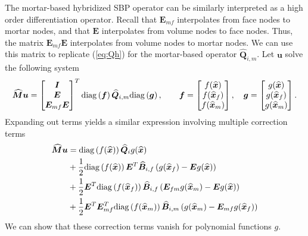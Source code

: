 \documentclass{svjour3}                     %
\renewcommand{\hat}{\widehat}
\newcommand{\diag}[1]{{\rm diag}\LRp{#1}}
\newcommand{\pd}[2]{\frac{\partial#1}{\partial#2}}
\newcommand{\LRp}[1]{\left( #1 \right)}
\begin{document}

The mortar-based hybridized SBP operator can be similarly interpreted as a high order differentiation operator.  Recall that $\bm{E}_{mf}$ interpolates from face nodes to mortar nodes, and that $\bm{E}$ interpolates from volume nodes to face nodes.  Thus, the matrix $\bm{E}_{mf}\bm{E}$ interpolates from volume nodes to mortar nodes.  We can use this matrix to replicate (\ref{eq:Qh}) for the mortar-based operator $\hat{\bm{Q}}_{i,m}$.  Let $\bm{u}$ solve the following system
\begin{align}
\hat{\bm{M}}\bm{u} = \begin{bmatrix}
\bm{I}\\
\bm{E}\\
\bm{E}_{mf}\bm{E}
\end{bmatrix}^T \diag{\bm{f}}\hat{\bm{Q}}_{i,m} \diag{\bm{g}}, \qquad \bm{f} = \begin{bmatrix} f(\hat{\bm{x}}) \\ f(\hat{\bm{x}}_f)\\ f(\hat{\bm{x}}_m)\end{bmatrix}, \quad \bm{g} = \begin{bmatrix} g(\hat{\bm{x}}) \\ g(\hat{\bm{x}}_f)\\ g(\hat{\bm{x}}_m)\end{bmatrix}.
\label{eq:Qm}
\end{align}
Expanding out terms yields a similar expression involving multiple correction terms
\begin{align}
\hat{\bm{M}}\bm{u} &= \diag{f(\hat{\bm{x}})}\hat{\bm{Q}}_i{g}(\hat{\bm{x}}) \label{eq:mhsbp_correction}\\
&+ \frac{1}{2} \diag{f(\hat{\bm{x}})}\bm{E}^T\hat{\bm{B}}_{i,f}\LRp{g(\hat{\bm{x}}_f) - \bm{E}g(\hat{\bm{x}})} \nonumber\\
&+ \frac{1}{2} \bm{E}^T\diag{f(\hat{\bm{x}}_f)}\hat{\bm{B}}_{i,f}\LRp{\bm{E}_{fm}g(\hat{\bm{x}}_m) - \bm{E}g(\hat{\bm{x}})} \nonumber\\
&+ \frac{1}{2} \bm{E}^T\bm{E}_{mf}^T\diag{f(\hat{\bm{x}}_m)}\hat{\bm{B}}_{i,m}\LRp{g(\hat{\bm{x}}_m) - \bm{E}_{mf}g(\hat{\bm{x}}_f)} \nonumber
\end{align}
We can show that these correction terms vanish for polynomial functions $g$.  %
\end{document}
